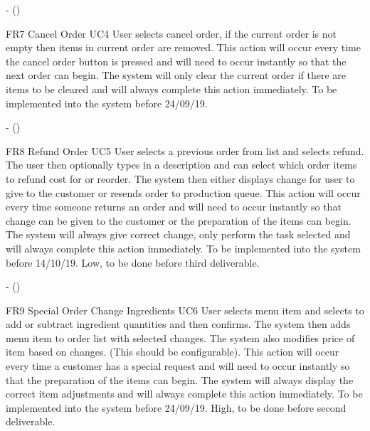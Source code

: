\noindent \textbf{} -  ()\\
\begin{small}
	
\end{small}
\linebreak

FR7
Cancel Order
UC4
User selects cancel order, if the current order is not empty then items in current order are removed. This action will occur every time the cancel order button is pressed and will need to occur instantly so that the next order can begin. The system will only clear the current order if there are items to be cleared and will always complete this action immediately. To be implemented into the system before 24/09/19.

\noindent \textbf{} -  ()\\
\begin{small}
	
\end{small}
\linebreak


FR8
Refund Order
UC5
User selects a previous order from list and selects refund. The user then optionally types in a description and can select which order items to refund cost for or reorder. The system then either displays change for user to give to the customer or resends order to production queue. This action will occur every time someone returns an order and will need to occur instantly so that change can be given to the customer or the preparation of the items can begin. The system will always give correct change, only perform the task selected and will always complete this action immediately. To be implemented into the system before 14/10/19.
Low, to be done before third deliverable.

\noindent \textbf{} -  ()\\
\begin{small}
	
\end{small}
\linebreak

FR9
Special Order Change Ingredients
UC6
User selects menu item and selects to add or subtract ingredient quantities and then confirms. The system then adds menu item to order list with selected changes. The system also modifies price of item based on changes. (This should be configurable). This action will occur every time a customer has a special request and will need to occur instantly so that the preparation of the items can begin. The system will always display the correct item adjustments and  will always complete this action immediately. To be implemented into the system before 24/09/19.
High, to be done before second deliverable.

